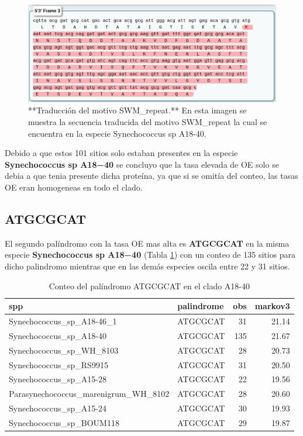 \documentclass[
]{book}
\begin{document}
\begin{figure}

{\centering \includegraphics[width=1\linewidth]{Clados/Clado_A18-40/SWM_repeat_AA} 

}

\caption{**Traducción del motivo SWM\_repeat.** En esta imagen se muestra la secuencia traducida del motivo SWM\_repeat la cual se encuentra en la especie Synechococcus sp A18-40.}\label{fig:FIG10}
\end{figure}

Debido a que estos 101 sitios solo estaban presentes en la especie \textbf{Synechococcus sp A18−40} se concluyo que la tasa elevada de OE solo se debia a que tenia presente dicha proteína, ya que si se omitía del conteo, las tasas OE eran homogeneas en todo el clado.

\hypertarget{atgcgcat}{%
\subsection{ATGCGCAT}\label{atgcgcat}}

El segundo palíndromo con la tasa OE mas alta es \textbf{ATGCGCAT} en la misma especie \textbf{Synechococcus sp A18−40} (Tabla \ref{tab:TAB3}) con un conteo de 135 sitios para dicho palindromo mientras que en las demás especies oscila entre 22 y 31 sitios.

\begin{table}

\caption{\label{tab:TAB3}Conteo del palíndromo ATGCGCAT en el clado A18-40}
\centering
\begin{tabular}[t]{l|l|r|r}
\hline
spp & palindrome & obs & markov3\\
\hline
Synechococcus\_sp\_A18-46\_1 & ATGCGCAT & 31 & 21.14\\
\hline
Synechococcus\_sp\_A18-40 & ATGCGCAT & 135 & 21.67\\
\hline
Synechococcus\_sp\_WH\_8103 & ATGCGCAT & 28 & 20.73\\
\hline
Synechococcus\_sp\_RS9915 & ATGCGCAT & 31 & 20.50\\
\hline
Synechococcus\_sp\_A15-28 & ATGCGCAT & 22 & 19.56\\
\hline
Parasynechococcus\_marenigrum\_WH\_8102 & ATGCGCAT & 28 & 20.60\\
\hline
Synechococcus\_sp\_A15-24 & ATGCGCAT & 30 & 19.93\\
\hline
Synechococcus\_sp\_BOUM118 & ATGCGCAT & 29 & 19.87\\
\hline
\end{tabular}
\end{table}
\end{document}
